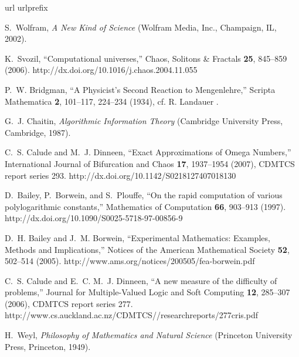 \documentclass[12pt]{article}
\begin{document}
%
%

\begin{thebibliography}{10}
\newcommand{\enquote}[1]{``#1''}
\expandafter\ifx\csname url\endcsname\relax
  \def\url#1{{#1}}\fi
\expandafter\ifx\csname urlprefix\endcsname\relax\def\urlprefix{}\fi

S.~Wolfram, {\em A New Kind of Science\/} (Wolfram Media, Inc., Champaign, IL,
  2002).

K.~Svozil, \enquote{Computational universes,} Chaos, Solitons \& Fractals {\bf
  25}, 845--859 (2006).
\newline http://dx.doi.org/10.1016/j.chaos.2004.11.055

P.~W. Bridgman, \enquote{A Physicist's Second Reaction to {M}engenlehre,}
  Scripta Mathematica {\bf 2}, 101--117, 224--234 (1934), cf. R. Landauer
  \cite{landauer-95}.

G.~J. Chaitin, {\em Algorithmic Information Theory\/} (Cambridge University
  Press, Cambridge, 1987).

C.~S. Calude and M.~J. Dinneen, \enquote{Exact Approximations of Omega
  Numbers,} International Journal of Bifurcation and Chaos {\bf 17}, 1937--1954
  (2007), {CDMTCS} report series 293.
\newline http://dx.doi.org/10.1142/S0218127407018130

D.~Bailey, P.~Borwein, and S.~Plouffe, \enquote{On the rapid computation of
  various polylogarithmic constants,} Mathematics of Computation {\bf 66},
  903--913 (1997).
\newline http://dx.doi.org/10.1090/S0025-5718-97-00856-9

D.~H. Bailey and J.~M. Borwein, \enquote{Experimental Mathematics: Examples,
  Methods and Implications,} Notices of the American Mathematical Society {\bf
  52}, 502--514 (2005).
\newline http://www.ams.org/notices/200505/fea-borwein.pdf

C.~S. Calude and E.~C. M.~J. Dinneen, \enquote{A new measure of the difficulty
  of problems,} Journal for Multiple-Valued Logic and Soft Computing {\bf 12},
  285--307 (2006), {CDMTCS} report series 277.
\newline http://www.cs.auckland.ac.nz/CDMTCS//researchreports/277cris.pdf

H.~Weyl, {\em Philosophy of Mathematics and Natural Science\/} (Princeton
  University Press, Princeton, 1949).


\end{thebibliography}
\end{document}
